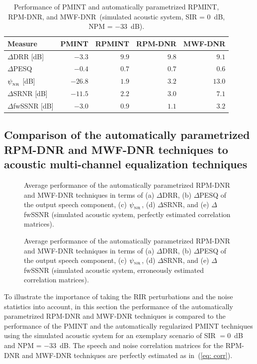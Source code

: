 \documentclass[10pt]{IEEEtran}
\begin{document}
\begin{table}[b!]
  \def\tabcolsep{5pt}
  \caption{Performance of PMINT and automatically parametrized RPMINT, RPM-DNR, and MWF-DNR~(simulated acoustic system, SIR = $0$~dB, NPM = $-33$~dB).}
  \label{tbl: perf}
  \begin{tabularx}{\linewidth}{Xrrrr}
    \toprule
      Measure & PMINT & RPMINT & RPM-DNR & MWF-DNR \\
      \midrule
      $\Delta$DRR [dB] & $-3.3$ & $\mathbf{9.9}$ & $9.8$ & $9.1$ \\
      $\Delta$PESQ & $-0.4$ & $\mathbf{0.7}$ & $\mathbf{0.7}$ & $0.6$ \\
      $\psi_{_{\rm NR}} $ [dB] & $-26.8$ & $1.9$ & $3.2$ & $\mathbf{13.0}$ \\
      $\Delta$SRNR [dB] & $-11.5$ & $2.2$ & $3.0$ & $\mathbf{7.1}$ \\
      $\Delta$fwSSNR [dB] & $-3.0$ & $0.9$ & $1.1$ & $\mathbf{3.2}$ \\
    \bottomrule
  \end{tabularx}
\end{table}

\subsection{Comparison of the automatically parametrized RPM-DNR and MWF-DNR techniques to acoustic multi-channel equalization techniques}
\label{sec: aem}


\begin{figure}[t!]
\centering

\caption{Average performance of the automatically parametrized RPM-DNR and MWF-DNR techniques in terms of (a) $\Delta$DRR, (b) $\Delta$PESQ of the output speech component, (c) $\psi_{_{\rm NR}} $, (d) $\Delta$SRNR, and (e) $\Delta$fwSSNR (simulated acoustic system, perfectly estimated correlation matrices).}
\label{fig: perfect}
\end{figure}
\begin{figure}[t!]
\centering

\caption{Average performance of the automatically parametrized RPM-DNR and MWF-DNR techniques in terms of (a) $\Delta$DRR, (b) $\Delta$PESQ of the output speech component, (c) $\psi_{_{\rm NR}} $, (d) $\Delta$SRNR, and (e) $\Delta$fwSSNR (simulated acoustic system, erroneously estimated correlation matrices).}
\label{fig: estimate}
\end{figure}
To illustrate the importance of taking the RIR perturbations and the noise statistics into account, in this section the performance of the automatically parametrized RPM-DNR and MWF-DNR techniques is compared to the performance of the PMINT and the automatically regularized PMINT techniques using the simulated acoustic system for an exemplary scenario of SIR $= 0$~dB and NPM = $-33$~dB. 
The speech and noise correlation matrices for the RPM-DNR and MWF-DNR techniques are perfectly estimated as in~(\ref{eq: corr}).
\end{document}
